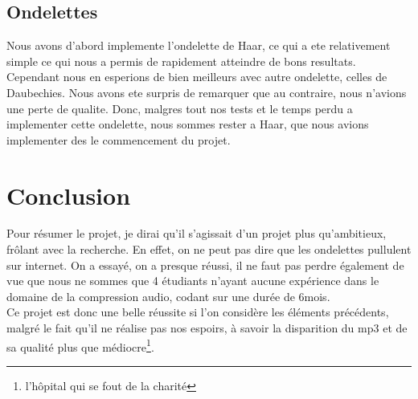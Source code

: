 \documentclass[a4paper,12pt]{report}
\begin{document}
\section{Ondelettes}
Nous avons d'abord implemente l'ondelette de Haar, ce qui a ete
relativement simple ce qui nous a permis de rapidement atteindre de
bons resultats. Cependant nous en esperions de bien meilleurs avec
autre ondelette,  celles de Daubechies. Nous avons ete surpris de
remarquer que au contraire, nous n'avions une perte de qualite. Donc,
malgres tout nos tests et le temps perdu a implementer cette
ondelette, nous sommes rester a Haar, que nous avions implementer des
le commencement du projet.
\chapter{Conclusion}
Pour résumer le projet, je dirai qu'il s'agissait d'un projet plus qu'ambitieux,
frôlant avec la recherche. En effet, on ne peut pas dire que les ondelettes
pullulent sur internet. On a essayé, on a presque réussi, il ne faut pas perdre
également de vue que nous ne sommes que 4 étudiants n'ayant aucune expérience
dans le domaine de la compression audio, codant sur une durée de 6mois.\\
Ce projet est donc une belle réussite si l'on considère les éléments
précédents, malgré le fait qu'il ne réalise pas nos espoirs, à savoir la
disparition du mp3 et de sa qualité plus que médiocre\footnote{l'hôpital qui se
fout de la charité}.
\end{document}
